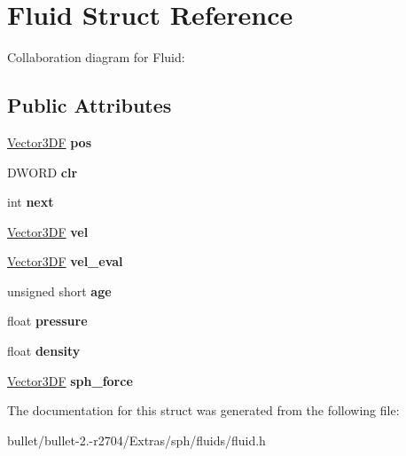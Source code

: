 \hypertarget{struct_fluid}{\section{Fluid Struct Reference}
\label{struct_fluid}
}


Collaboration diagram for Fluid\+:
\subsection*{Public Attributes}
\begin{DoxyCompactItemize}
\item 
\hypertarget{struct_fluid_a55313a878a99485a26be53242f113a35}{\hyperlink{class_vector3_d_f}{Vector3\+D\+F} {\bfseries pos}}\label{struct_fluid_a55313a878a99485a26be53242f113a35}

\item 
\hypertarget{struct_fluid_a1409306b0fa9baad13855ae4a8b88e0c}{D\+W\+O\+R\+D {\bfseries clr}}\label{struct_fluid_a1409306b0fa9baad13855ae4a8b88e0c}

\item 
\hypertarget{struct_fluid_a65cc149a6575670c3c613c0b9f75a0b7}{int {\bfseries next}}\label{struct_fluid_a65cc149a6575670c3c613c0b9f75a0b7}

\item 
\hypertarget{struct_fluid_a3e3ffe696d0cfaf5deba1c34520f1621}{\hyperlink{class_vector3_d_f}{Vector3\+D\+F} {\bfseries vel}}\label{struct_fluid_a3e3ffe696d0cfaf5deba1c34520f1621}

\item 
\hypertarget{struct_fluid_ab145ae9cbe5fcc9fde4670ee5d714a1e}{\hyperlink{class_vector3_d_f}{Vector3\+D\+F} {\bfseries vel\+\_\+eval}}\label{struct_fluid_ab145ae9cbe5fcc9fde4670ee5d714a1e}

\item 
\hypertarget{struct_fluid_a40dc8fa5f1facebce36fc9d2d204f40b}{unsigned short {\bfseries age}}\label{struct_fluid_a40dc8fa5f1facebce36fc9d2d204f40b}

\item 
\hypertarget{struct_fluid_a7fbaa85eec603756fa273141bbf97766}{float {\bfseries pressure}}\label{struct_fluid_a7fbaa85eec603756fa273141bbf97766}

\item 
\hypertarget{struct_fluid_a37d21500ee569e487b5d51f744804dab}{float {\bfseries density}}\label{struct_fluid_a37d21500ee569e487b5d51f744804dab}

\item 
\hypertarget{struct_fluid_ab59f90c315b9ede65d5d4a4af9d375f6}{\hyperlink{class_vector3_d_f}{Vector3\+D\+F} {\bfseries sph\+\_\+force}}\label{struct_fluid_ab59f90c315b9ede65d5d4a4af9d375f6}

\end{DoxyCompactItemize}


The documentation for this struct was generated from the following file\+:\begin{DoxyCompactItemize}
\item 
bullet/bullet-\/2.-\/r2704/\+Extras/sph/fluids/fluid.\+h\end{DoxyCompactItemize}
